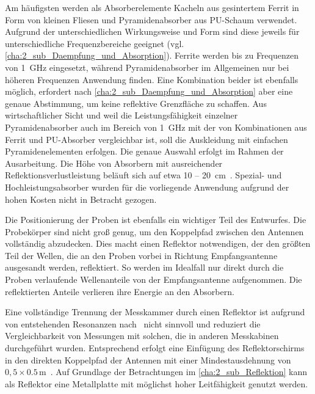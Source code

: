 \par
\vspace{\linespace}
Am häufigsten werden als Absorberelemente Kacheln aus gesintertem Ferrit in Form von kleinen Fliesen und Pyramidenabsorber aus PU-Schaum verwendet. Aufgrund der unterschiedlichen Wirkungsweise und Form sind diese jeweils für unterschiedliche Frequenzbereiche geeignet (vgl. \Abschnitt\ref{cha:2_sub_Daempfung_und_Absorption}). Ferrite werden bis zu Frequenzen von \SI{1}{\giga\hertz} eingesetzt, während Pyramidenabsorber im Allgemeinen nur bei höheren Frequenzen Anwendung finden. Eine Kombination beider ist ebenfalls möglich, erfordert nach \Abschnitt\ref{cha:2_sub_Daempfung_und_Absorption} aber eine genaue Abstimmung, um keine reflektive Grenzfläche zu schaffen. Aus wirtschaftlicher Sicht und weil die Leistungsfähigkeit einzelner Pyramidenabsorber auch im Bereich von \SI{1}{\giga\hertz} mit der von Kombinationen aus Ferrit und PU-Absorber vergleichbar ist, soll die Auskleidung mit einfachen Pyramidenelementen erfolgen. Die genaue Auswahl erfolgt im Rahmen der Ausarbeitung. Die Höhe von Absorbern mit ausreichender Reflektionsverlustleistung beläuft sich auf etwa 10 -- \SI{20}{\centi\meter}~\cite{Holland_Shielding_Absorber, Telemeter_Produktseite, Eco_Messtechnik_Absorber}. Spezial- und Hochleistungsabsorber wurden für die vorliegende Anwendung aufgrund der hohen Kosten nicht in Betracht gezogen. 
\par
\vspace{\linespace} 
Die Positionierung der Proben ist ebenfalls ein wichtiger Teil des Entwurfes. Die Probekörper sind nicht groß genug, um den Koppelpfad zwischen den Antennen vollständig abzudecken. Dies macht einen Reflektor notwendigen, der den größten Teil der Wellen, die an den Proben vorbei in Richtung Empfangsantenne ausgesandt werden, reflektiert. So werden im Idealfall nur direkt durch die Proben verlaufende Wellenanteile von der Empfangsantenne aufgenommen. Die reflektierten Anteile verlieren ihre Energie an den Absorbern.   
\par
\vspace{\linespace}
Eine vollständige Trennung der Messkammer durch einen Reflektor ist aufgrund von entstehenden Resonanzen nach~\cite{Techniques_Shielding_Effectiveness_Far_Field_Simulation} nicht sinnvoll und reduziert die Vergleichbarkeit von Messungen mit solchen, die in anderen Messkabinen durchgeführt wurden. Entsprechend erfolgt eine Einfügung des Reflektorschirms in den direkten Koppelpfad der Antennen mit einer Mindestausdehnung von $0,5 \times 0.5\,\si{\meter}$~\cite{DIN_EN_61000-4-3}. Auf Grundlage der Betrachtungen im \Abschnitt\ref{cha:2_sub_Reflektion} kann als Reflektor eine Metallplatte mit möglichst hoher Leitfähigkeit genutzt werden.
